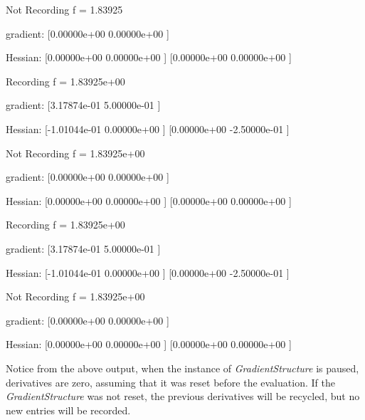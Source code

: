 \documentclass[12pt,a4paper]{article}
\begin{document}
\begin{myoutput}
Not Recording
f = 1.83925

gradient:
[0.00000e+00    0.00000e+00    ]

Hessian:
[0.00000e+00    0.00000e+00    ]
[0.00000e+00    0.00000e+00    ]


Recording
f = 1.83925e+00

gradient:
[3.17874e-01    5.00000e-01    ]

Hessian:
[-1.01044e-01   0.00000e+00    ]
[0.00000e+00    -2.50000e-01   ]


Not Recording
f = 1.83925e+00

gradient:
[0.00000e+00    0.00000e+00    ]

Hessian:
[0.00000e+00    0.00000e+00    ]
[0.00000e+00    0.00000e+00    ]


Recording
f = 1.83925e+00

gradient:
[3.17874e-01    5.00000e-01    ]

Hessian:
[-1.01044e-01   0.00000e+00    ]
[0.00000e+00    -2.50000e-01   ]


Not Recording
f = 1.83925e+00

gradient:
[0.00000e+00    0.00000e+00    ]

Hessian:
[0.00000e+00    0.00000e+00    ]
[0.00000e+00    0.00000e+00    ]
\end{myoutput}
Notice from the above output, when the instance of \textit{GradientStructure} is paused, derivatives are zero, assuming that it was reset before the evaluation. If the \textit{GradientStructure} was not reset, the previous derivatives will be recycled, but no new entries will be recorded.
\end{document}

